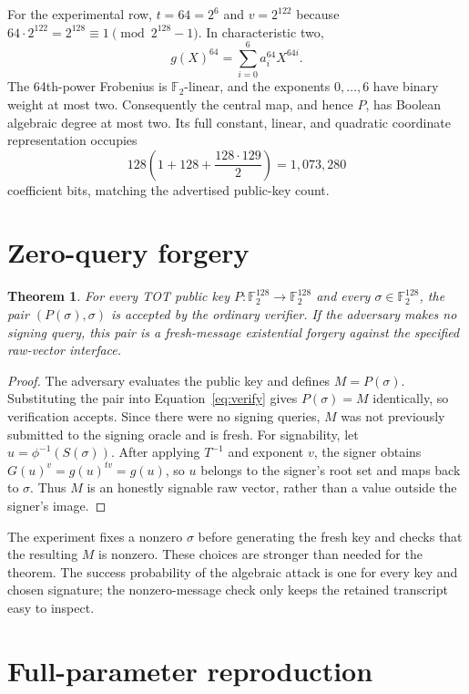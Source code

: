 \documentclass[10pt,a4paper]{article}
\newtheorem{theorem}{Theorem}
\newcommand{\F}{\mathbb F}
\begin{document}
For the experimental row, $t=64=2^6$ and
$v=2^{122}$ because $64\cdot2^{122}=2^{128}\equiv1\pmod{2^{128}-1}$.
In characteristic two,
\[
  g(X)^{64}=\sum_{i=0}^{6}a_i^{64}X^{64i}.
\]
The 64th-power Frobenius is $\F_2$-linear, and the exponents $0,\ldots,6$
have binary weight at most two.  Consequently the central map, and hence
$P$, has Boolean algebraic degree at most two.  Its full constant, linear,
and quadratic coordinate representation occupies
\[
  128\left(1+128+\frac{128\cdot129}{2}\right)
  =1{,}073{,}280
\]
coefficient bits, matching the advertised public-key count.

\section{Zero-query forgery}

\begin{theorem}
For every TOT public key $P:\F_2^{128}\rightarrow\F_2^{128}$ and every
$\sigma\in\F_2^{128}$, the pair $(P(\sigma),\sigma)$ is accepted by the
ordinary verifier.  If the adversary makes no signing query, this pair is a
fresh-message existential forgery against the specified raw-vector
interface.
\end{theorem}

\begin{proof}
The adversary evaluates the public key and defines $M=P(\sigma)$.  Substituting
the pair into Equation~\eqref{eq:verify} gives
$P(\sigma)=M$ identically, so verification accepts.  Since there were no
signing queries, $M$ was not previously submitted to the signing oracle and
is fresh.  For signability, let $u=\phi^{-1}(S(\sigma))$.  After applying
$T^{-1}$ and exponent $v$, the signer obtains
$G(u)^v=g(u)^{tv}=g(u)$, so $u$ belongs to the signer's root set and maps back
to $\sigma$.  Thus $M$ is an honestly signable raw vector, rather than a
value outside the signer's image.
\end{proof}

The experiment fixes a nonzero $\sigma$ before generating the fresh key and
checks that the resulting $M$ is nonzero.  These choices are stronger than
needed for the theorem.  The success probability of the algebraic attack is
one for every key and chosen signature; the nonzero-message check only keeps
the retained transcript easy to inspect.

\section{Full-parameter reproduction}
\end{document}
